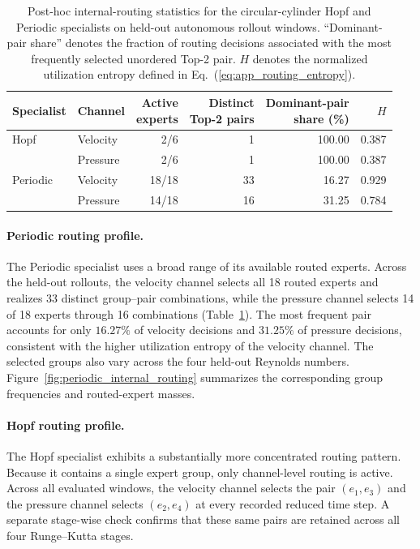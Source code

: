 \documentclass{article}
\def\plaineqref#1{\ref{#1}}
\begin{document}
\par


\begin{table}[H]
\centering
\caption{
Post-hoc internal-routing statistics for the circular-cylinder Hopf and Periodic specialists on held-out autonomous rollout windows. ``Dominant-pair share'' denotes the fraction of routing decisions associated with the most frequently selected unordered Top-2 pair. $H$ denotes the normalized utilization entropy defined in Eq.~(\plaineqref{eq:app_routing_entropy}).
}
\label{tab:internal_routing_summary}
\small
\setlength{\tabcolsep}{5pt}
\begin{tabular}{@{}llrrrr@{}}
\toprule
Specialist & Channel & \shortstack{Active\\experts} & \shortstack{Distinct\\Top-2 pairs} & \shortstack{Dominant-pair\\share (\%)} & $H$ \\
\midrule
Hopf & Velocity & 2/6 & 1 & 100.00 & 0.387 \\
     & Pressure & 2/6 & 1 & 100.00 & 0.387 \\
\addlinespace
Periodic & Velocity & 18/18 & 33 & 16.27 & 0.929 \\
         & Pressure & 14/18 & 16 & 31.25 & 0.784 \\
\bottomrule
\end{tabular}
\end{table}


\par

\paragraph{Periodic routing profile.}
The Periodic specialist uses a broad range of its available routed experts. Across the held-out rollouts, the velocity channel selects all 18 routed experts and realizes 33 distinct group--pair combinations, while the pressure channel selects 14 of 18 experts through 16 combinations (Table~\ref{tab:internal_routing_summary}). The most frequent pair accounts for only $16.27\%$ of velocity decisions and $31.25\%$ of pressure decisions, consistent with the higher utilization entropy of the velocity channel. The selected groups also vary across the four held-out Reynolds numbers.
Figure~\ref{fig:periodic_internal_routing} summarizes the corresponding group frequencies and routed-expert masses.



\paragraph{Hopf routing profile.}
The Hopf specialist exhibits a substantially more concentrated routing pattern. Because it contains a single expert group, only channel-level routing is active. Across all evaluated windows, the velocity channel selects the pair
$(e_1,e_3)$ and the pressure channel selects $(e_2,e_4)$ at every recorded reduced time step. A separate stage-wise check confirms that these same pairs are retained across all four Runge--Kutta stages.
\end{document}
